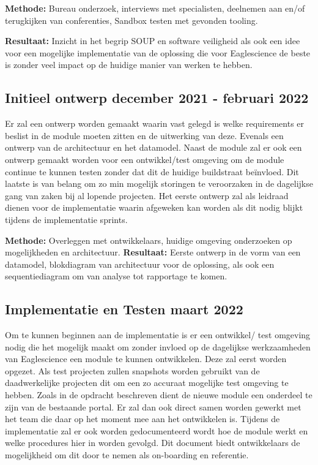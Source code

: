 \textbf{Methode:} Bureau onderzoek, interviews met specialisten, deelnemen aan en/of terugkijken van conferenties, Sandbox testen met gevonden tooling.

\textbf{Resultaat:} Inzicht in het begrip SOUP en software veiligheid als ook een idee voor een mogelijke implementatie van de oplossing die voor Eaglescience de beste is zonder veel impact op de huidige manier van werken te hebben.

\subsection{Initieel ontwerp \textbf{december 2021 - februari 2022 }}\label{subsec:initieel-ontwerp}
Er zal een ontwerp worden gemaakt waarin vast gelegd is welke requirements er beslist in de module moeten zitten en de uitwerking van deze. Evenals een ontwerp van de architectuur en het datamodel. Naast de module zal er ook een ontwerp gemaakt worden voor een ontwikkel/test omgeving om de module continue te kunnen testen zonder dat dit de huidige buildstraat beïnvloed. Dit laatste is van belang om zo min mogelijk storingen te veroorzaken in de dagelijkse gang van zaken bij al lopende projecten. Het eerste ontwerp zal als leidraad dienen voor de implementatie waarin afgeweken kan worden als dit nodig blijkt tijdens de implementatie sprints.

\textbf{Methode:} Overleggen met ontwikkelaars, huidige omgeving onderzoeken op mogelijkheden en architectuur.
\textbf{Resultaat:} Eerste ontwerp in de vorm van een datamodel, blokdiagram van architectuur voor de oplossing, als ook een sequentiediagram om van analyse tot rapportage te komen.

\subsection{Implementatie en Testen \textbf{maart 2022 }}\label{subsec:implementatie-en-testen}
Om te kunnen beginnen aan de implementatie is er een ontwikkel/ test omgeving nodig die het mogelijk maakt om zonder invloed op de dagelijkse werkzaamheden van Eaglescience een module te kunnen ontwikkelen. Deze zal eerst worden opgezet. Als test projecten zullen snapshots worden gebruikt van de daadwerkelijke projecten dit om een zo accuraat mogelijke test omgeving te hebben. Zoals in de opdracht beschreven dient de nieuwe module een onderdeel te zijn van de bestaande portal. Er zal dan ook direct samen worden gewerkt met het team die daar op het moment mee aan het ontwikkelen is. Tijdens de implementatie zal er ook worden gedocumenteerd wordt hoe de module werkt en welke procedures hier in worden gevolgd. Dit document biedt ontwikkelaars de mogelijkheid om dit door te nemen als on-boarding en referentie.

